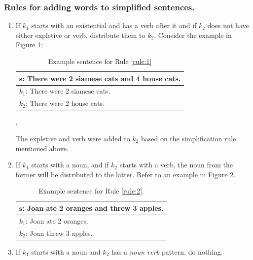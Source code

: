 \documentclass[11pt]{article}
\begin{document}
\subsubsection{Rules for adding words to simplified sentences.}\label{sec:secondsentencesimplification}
\begin{enumerate}
\item \label{rule:1}
If $\mathit{k_{1}}$ starts with an existential and has a verb after it and if $\mathit{k_{2}}$ does not have either expletive or verb, distribute them to $\mathit{k_{2}}$. Consider the example in Figure \ref{figure:9}:

\newpage
\begin{table}[h!]
\centering
\begin{tabular}{ | m{25em} | }
\hline
 $\mathbf{s}$\textbf{: There were 2 siamese cats and 4 house cats.}\\
\hline
$\mathit{k_{1}}$: There were 2 siamese cats.\\
\hline
$\mathit{k_{2}}$: There were 2 house cats.\\
\hline
\end{tabular}
\caption{Example sentence for Rule \ref{rule:1}}.
\label{figure:9}
\end{table}

The expletive and verb were added to $\mathit{k_{2}}$ based on the simplification rule mentioned above.

\item \label{rule:2}
If $\mathit{k_{1}}$ starts with a noun, and if $\mathit{k_{2}}$ starts with a verb, the noun from the former will be distributed to the latter. Refer to an example in Figure \ref{figure:10}.

\begin{table}[h!]
\centering
\begin{tabular}{ | m{25em} | }
\hline
 $\mathbf{s}$\textbf{: Joan ate 2 oranges and threw 3 apples.}\\
\hline
$\mathit{k_{1}}$: Joan ate 2 oranges.\\
\hline
$\mathit{k_{2}}$: Joan threw 3 apples.\\
\hline
\end{tabular}
\caption{Example sentence for Rule \ref{rule:2}.}
\label{figure:10}
\end{table}

\item  \label{rule:3}
If $\mathit{k_{1}}$ starts with a noun and $\mathit{k_{2}}$ has a \textit{noun verb} pattern, do nothing.


\end{enumerate}
\end{document}
